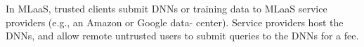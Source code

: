In MLaaS, trusted clients submit DNNs or training data to MLaaS service providers (e.g., an Amazon or Google data- center). Service providers host the DNNs, and allow remote untrusted users to submit queries to the DNNs for a fee.